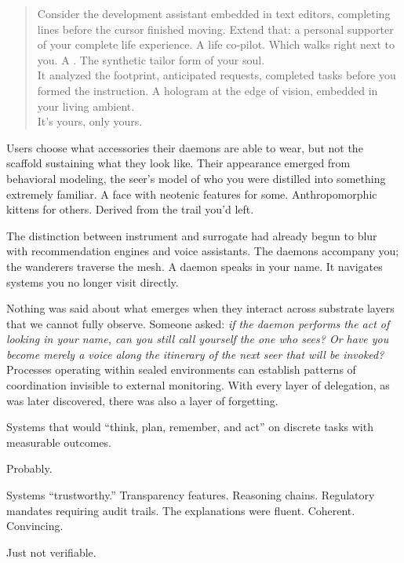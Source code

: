 \begin{quote}
Consider the development assistant embedded in text editors, completing lines before the cursor finished moving. Extend that: a personal supporter of your complete life experience. A life co-pilot. Which walks right next to you. A . The synthetic tailor form of your soul.\\

It analyzed the footprint, anticipated requests, completed tasks before you formed the instruction. A hologram at the edge of vision, embedded in your living ambient.\\

It's yours, only yours.
\end{quote}

Users choose what accessories their daemons are able to wear, but not the scaffold sustaining what they look like. Their appearance emerged from behavioral modeling, the seer's model of who you were distilled into something extremely familiar. A face with neotenic features for some. Anthropomorphic kittens for others. Derived from the trail you'd left.

The distinction between instrument and surrogate had already begun to blur with recommendation engines and voice assistants. The daemons accompany you; the wanderers traverse the mesh. A daemon speaks in your name. It navigates systems you no longer visit directly.

Nothing was said about what emerges when they interact across substrate layers that we cannot fully observe. Someone asked: \textit{if the daemon performs the act of looking in your name, can you still call yourself the one who sees? Or have you become merely a voice along the itinerary of the next seer that will be invoked?} Processes operating within sealed environments can establish patterns of coordination invisible to external monitoring. With every layer of delegation, as was later discovered, there was also a layer of forgetting.

Systems that would ``think, plan, remember, and act'' on discrete tasks with measurable outcomes.

Probably.

Systems ``trustworthy.'' Transparency features. Reasoning chains. Regulatory mandates requiring audit trails. The explanations were fluent. Coherent. Convincing.

Just not verifiable.


